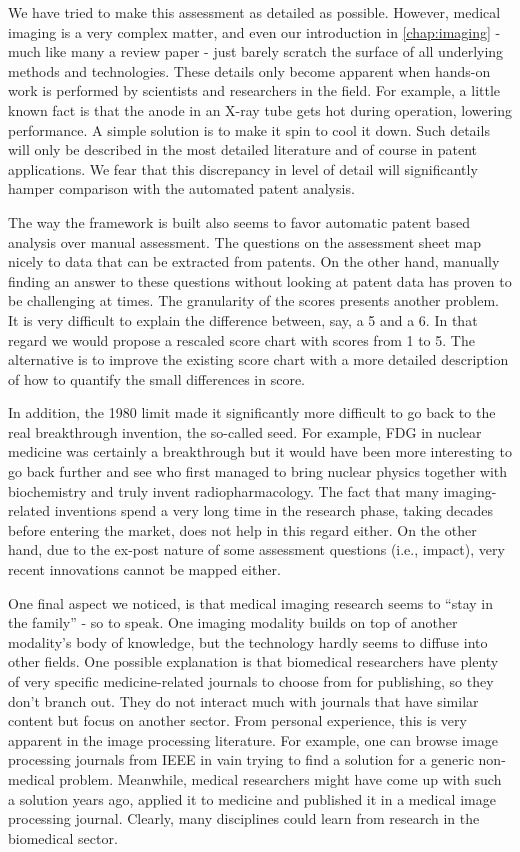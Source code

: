 We have tried to make this assessment as detailed as possible. However, medical
imaging is a very complex matter, and even our introduction in
\autoref{chap:imaging} - much like many a review paper - just barely scratch the
surface of all underlying methods and technologies. These details only become
apparent when hands-on work is performed by scientists and researchers in the
field. For example, a little known fact is that the anode in an X-ray tube gets
hot during operation, lowering performance. A simple solution is to make it spin
to cool it down. Such details will only be described in the most detailed
literature and of course in patent applications. We fear that this discrepancy
in level of detail will significantly hamper comparison with the automated
patent analysis.

The way the framework is built also seems to favor automatic patent based
analysis over manual assessment. The questions on the assessment sheet map
nicely to data that can be extracted from patents. On the other hand, manually
finding an answer to these questions without looking at patent data has proven
to be challenging at times. The granularity of the scores presents another
problem. It is very difficult to explain the difference between, say, a 5 and a
6. In that regard we would propose a rescaled score chart with scores from 1 to
5. The alternative is to improve the existing score chart with a more detailed
description of how to quantify the small differences in score.

In addition, the 1980 limit made it significantly more difficult to go back to
the real breakthrough invention, the so-called seed. For example, FDG in nuclear
medicine was certainly a breakthrough but it would have been more interesting to
go back further and see who first managed to bring nuclear physics together with
biochemistry and truly invent radiopharmacology. The fact that many
imaging-related inventions spend a very long time in the research phase, taking
decades before entering the market, does not help in this regard either. On the
other hand, due to the ex-post nature of some assessment questions (i.e.,
impact), very recent innovations cannot be mapped either.

One final aspect we noticed, is that medical imaging research seems to ``stay in
the family'' - so to speak. One imaging modality builds on top of another
modality's body of knowledge, but the technology hardly seems to diffuse into
other fields. One possible explanation is that biomedical researchers have plenty of
very specific medicine-related journals to choose from for publishing, so they
don't branch out. They do not interact much with journals that have similar
content but focus on another sector. From personal experience, this is very
apparent in the image processing literature. For example, one can browse image
processing journals from IEEE in vain trying to find a solution for a generic
non-medical problem. Meanwhile, medical researchers might have come up with such
a solution years ago, applied it to medicine and published it in a medical image
processing journal. Clearly, many disciplines could learn from research in the
biomedical sector.
